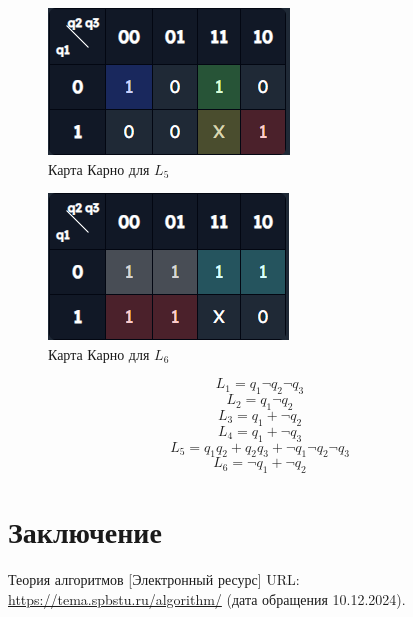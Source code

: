 \documentclass[a4paper, final]{article}
\begin{document}
\begin{figure}[H]
  \centering
  \includegraphics[width=0.5\linewidth]{l5.png}
  \caption{Карта Карно для $L_5$}
  \label{img:l5}
\end{figure}

\begin{figure}[H]
  \centering
  \includegraphics[width=0.5\linewidth]{l6.png}
  \caption{Карта Карно для $L_6$}
  \label{img:l6}
\end{figure}

\[L_1 = q_1 \neg q_2 \neg q_3\]
\[L_2 = q_1 \neg q_2\]
\[L_3 = q_1 + \neg q_2\]
\[L_4 = q_1 + \neg q_3\]
\[L_5 = q_1 q_2 + q_2 q_3 + \neg q_1 \neg q_2 \neg q_3\]
\[L_6 = \neg q_1 + \neg q_2\]


\cleardoublepage
{}
\newpage
{}
\section*{Заключение}


\cleardoublepage
{}
\newpage
\begin{thebibliography}{0}
	Теория алгоритмов [Электронный ресурс] URL: \url{https://tema.spbstu.ru/algorithm/} (дата обращения 10.12.2024).
\end{thebibliography}
\end{document}

